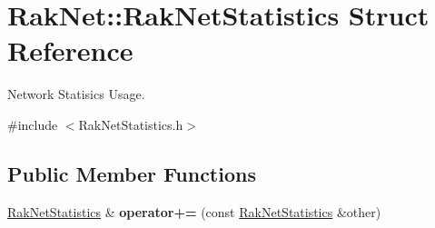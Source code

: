 \hypertarget{struct_rak_net_1_1_rak_net_statistics}{\section{Rak\-Net\-:\-:Rak\-Net\-Statistics Struct Reference}
\label{struct_rak_net_1_1_rak_net_statistics}
}


Network Statisics Usage.  




{\ttfamily \#include $<$Rak\-Net\-Statistics.\-h$>$}

\subsection*{Public Member Functions}
\begin{DoxyCompactItemize}
\item 
\hypertarget{struct_rak_net_1_1_rak_net_statistics_a9f6845ae79dda83c3361e0dc35427854}{\hyperlink{struct_rak_net_1_1_rak_net_statistics}{Rak\-Net\-Statistics} \& {\bfseries operator+=} (const \hyperlink{struct_rak_net_1_1_rak_net_statistics}{Rak\-Net\-Statistics} \&other)}\label{struct_rak_net_1_1_rak_net_statistics_a9f6845ae79dda83c3361e0dc35427854}

\end{DoxyCompactItemize}
